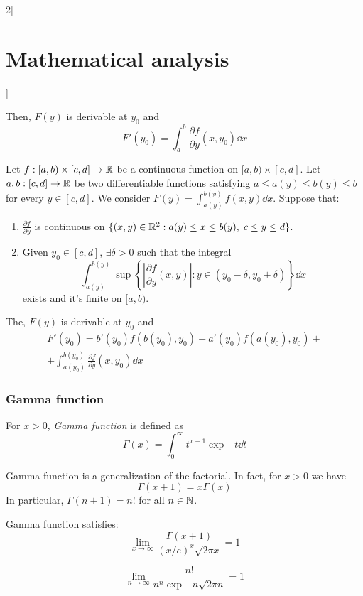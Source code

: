 \documentclass[../../../main.tex]{subfiles}
\begin{document}
\begin{multicols}{2}[\section{Mathematical analysis}]
\begin{theorem}
\begin{enumerate}
    \end{enumerate}
    Then, $F(y)$ is derivable at $y_0$ and $$F'(y_0)=\int_a^b\frac{\partial f}{\partial y}(x,y_0)\dd{x}$$
  \end{theorem}
  \begin{theorem}
    Let $f:[a,b)\times[c,d]\rightarrow\mathbb{R} $ be a continuous function on $[a,b)\times[c,d]$. Let $a,b:[c,d]\rightarrow\mathbb{R} $ be two differentiable functions satisfying $a\leq a(y)\leq b(y)\leq b$ for every $y\in[c,d]$. We consider $\displaystyle F(y)=\int_{a(y)}^{b(y)}f(x,y)\dd{x}$. Suppose that:
    \begin{enumerate}
      \item $\displaystyle\frac{\partial f}{\partial y}$ is continuous on $\{(x,y)\in\mathbb{R}^2:a(y)\leq x\leq b(y),\; c\leq y\leq d\}$.
      \item Given $y_0\in[c,d]$, $\exists\delta>0$ such that the integral $$\int_{a(y)}^{b(y)}\sup\left\{\left|\frac{\partial f}{\partial y}(x,y)\right|:y\in(y_0-\delta,y_0+\delta)\right\}\dd{x}$$ exists and it's finite on $[a,b)$.
    \end{enumerate}
    The, $F(y)$ is derivable at $y_0$ and
    \begin{multline*}
      F'(y_0)=b'(y_0)f(b(y_0),y_0)-a'(y_0)f(a(y_0),y_0)+\\+\int_{a(y_0)}^{b(y_0)}\frac{\partial f}{\partial y}(x,y_0)\dd{x}
    \end{multline*}
  \end{theorem}
  \subsubsection{Gamma function}
  \begin{definition}
    For $x>0$, \emph{Gamma function} is defined as $$\Gamma(x)=\int_0^\infty t^{x-1}\exp{-t}\dd{t}$$
  \end{definition}
  \begin{theorem}
    Gamma function is a generalization of the factorial. In fact, for $x>0$ we have $$\Gamma(x+1)=x\Gamma(x)$$ In particular, $\Gamma(n+1)=n!$ for all $n\in\mathbb{N} $.
  \end{theorem}
  \begin{theorem}
    Gamma function satisfies: $$\lim_{x\to\infty}\frac{\Gamma(x+1)}{(x/e)^x\sqrt{2\pi x}}=1$$
  \end{theorem}
  \begin{corollary}
    $$\lim_{n\to\infty}\frac{n!}{n^n\exp{-n}\sqrt{2\pi n}}=1$$
  \end{corollary}

\end{multicols}
\end{document}
